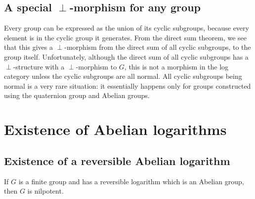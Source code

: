 \documentclass[a4paper]{amsart}
\begin{document}
\subsection{A special $\perp$-morphism for any group}

Every group can be expressed as the union of its cyclic subgroups,
because every element is in the cyclic group it generates. From the
direct sum theorem, we see that this gives a $\perp$-morphism from the
direct sum of all cyclic subgroups, to the group
itself. Unfortunately, although the direct sum of all cyclic subgroups
has a $\perp$-structure with a $\perp$-morphism to $G$, this is not a
morphism in the log category unless the cyclic subgroups are all
normal. All cyclic subgroups being normal is a very rare situation: it
essentially happens only for groups constructed using the quaternion
group and Abelian groups.

\section{Existence of Abelian logarithms}

\subsection{Existence of a reversible Abelian logarithm}

\begin{theorem}
  If $G$ is a finite group and has a reversible logarithm which is an
  Abelian group, then $G$ is nilpotent.
\end{theorem}
\end{document}
